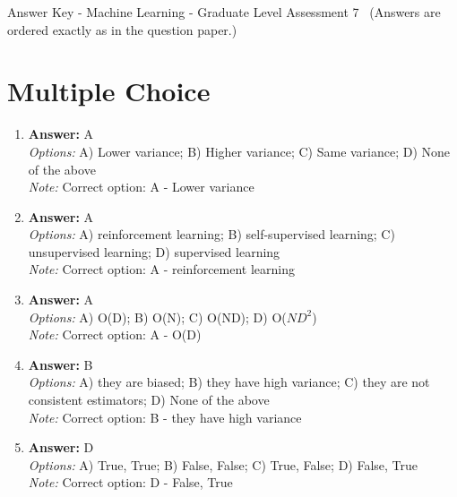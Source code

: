 \documentclass[12pt]{article}
\begin{document}
\begin{center}
Answer Key - Machine Learning - Graduate Level Assessment 7 \
\small (Answers are ordered exactly as in the question paper.)
\end{center}

\section*{Multiple Choice}
\begin{enumerate}[label=\arabic*.]
\item \textbf{Answer:} A
\\ \textit{Options:} A) Lower variance; B) Higher variance; C) Same variance; D) None of the above
\\ \textit{Note:} Correct option: A - Lower variance
\item \textbf{Answer:} A
\\ \textit{Options:} A) reinforcement learning; B) self-supervised learning; C) unsupervised learning; D) supervised learning
\\ \textit{Note:} Correct option: A - reinforcement learning
\item \textbf{Answer:} A
\\ \textit{Options:} A) O(D); B) O(N); C) O(ND); D) O($ND^2$)
\\ \textit{Note:} Correct option: A - O(D)
\item \textbf{Answer:} B
\\ \textit{Options:} A) they are biased; B) they have high variance; C) they are not consistent estimators; D) None of the above
\\ \textit{Note:} Correct option: B - they have high variance
\item \textbf{Answer:} D
\\ \textit{Options:} A) True, True; B) False, False; C) True, False; D) False, True
\\ \textit{Note:} Correct option: D - False, True
\end{enumerate}
\end{document}
